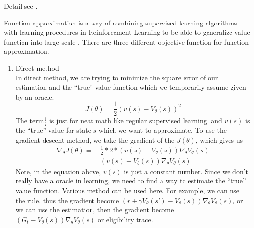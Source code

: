 \documentclass[9pt]{article}
\begin{document}
Detail see \citep{ortner2007linear}.

 \citep{Vanseijen2015Deeper} \citep{Riedmiller2005Neural}

 Function approximation is a way of combining supervised learning algorithms with learning procedures in Reinforcement Learning to be able to generalize value function into large scale . There are three different objective function for function approximation. 
\begin{enumerate}
\item Direct method\\
In direct method, we are trying to minimize the square error of our estimation and the ``true'' value function which we temporarily assume given by an oracle.
\[
J(\theta) = \frac{1}{2}(v(s) - V_{\theta}(s))^2
\]
The term$\frac{1}{2}$ is just for neat math like regular supervised learning, and $v(s)$ is the ``true'' value for state $s$ which we want to approximate. To use the gradient descent method, we take the gradient of the $J(\theta)$, which gives us
\[
\begin{split}
\nabla_{\theta} J(\theta) = &\ \frac{1}{2} * 2 * (v(s) - V_{\theta}(s)) \nabla_{\theta} V_{\theta}(s)\\
= &\ (v(s) - V_{\theta}(s)) \nabla_{\theta} V_{\theta}(s)
\end{split}
\]
Note, in the equation above, $v(s)$ is just a constant number. Since we don't really have a oracle in learning, we need to find a way to estimate the ``true'' value function. Various method can be used here. For example, we can use the  rule, thus the gradient become $(r + \gamma V_{\theta}(s') - V_{\theta}(s)) \nabla_{\theta} V_{\theta}(s)$, or we can use the  estimation, then the gradient become $(G_t - V_{\theta}(s)) \nabla_{\theta} V_{\theta}(s)$ or eligibility trace.


\end{enumerate}
\end{document}
